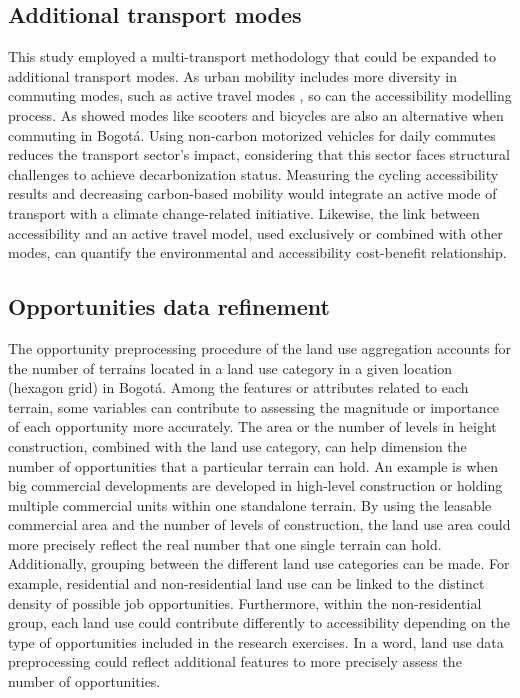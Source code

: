 \documentclass[12pt, a4paper]{report}
\begin{document}
\subsection{Additional transport modes}

This study employed a multi-transport methodology that could be expanded to additional transport modes. As urban mobility includes more diversity in commuting modes, such as active travel modes \citep{malteseActiveTravelSustainable2021}, so can the accessibility modelling process. As \citep{alcaldiadebogotad.c.EncuestaMovilidad20192019} showed modes like scooters and bicycles are also an alternative when commuting in Bogotá. Using non-carbon motorized vehicles for daily commutes reduces the transport sector's impact, considering that this sector faces structural challenges to achieve decarbonization status. Measuring the cycling accessibility results and decreasing carbon-based mobility would integrate an active mode of transport with a climate change-related initiative. Likewise, the link between accessibility and an active travel model, used exclusively or combined with other modes, can quantify the environmental and accessibility cost-benefit relationship. 


\subsection{Opportunities data refinement}

The opportunity preprocessing procedure of the land use aggregation accounts for the number of terrains located in a land use category in a given location (hexagon grid) in Bogotá. Among the features or attributes related to each terrain, some variables can contribute to assessing the magnitude or importance of each opportunity more accurately. The area or the number of levels in height construction, combined with the land use category, can help dimension the number of opportunities that a particular terrain can hold. An example is when big commercial developments are developed in high-level construction or holding multiple commercial units within one standalone terrain. By using the leasable commercial area and the number of levels of construction, the land use area could more precisely reflect the real number that one single terrain can hold. Additionally, grouping between the different land use categories can be made. For example, residential and non-residential land use can be linked to the distinct density of possible job opportunities. Furthermore, within the non-residential group, each land use could contribute differently to accessibility depending on the type of opportunities included in the research exercises. In a word, land use data preprocessing could reflect additional features to more precisely assess the number of opportunities.
\end{document}
